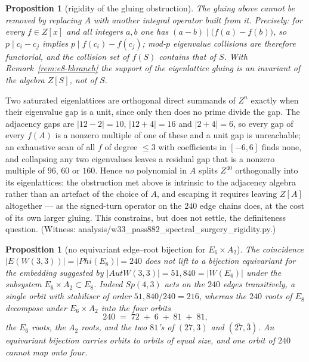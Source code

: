 \documentclass[12pt,a4paper]{article}
\def\mathbb#1{#1}%
\def\mathrm#1{#1}%
\def\texttt#1{#1}%
\def\Phi#1{Phi#1}%
\newtheorem{proposition}[theorem]{Proposition}
\theoremstyle{definition}
\newcommand{\Sp}{\mathrm{Sp}}
\newcommand{\Aut}{\mathrm{Aut}}
\newcommand{\ZZ}{\mathbb{Z}}
\begin{document}
\begin{proposition}[rigidity of the gluing obstruction]\label{prop:no-surgery}
The gluing above cannot be removed by replacing $A$ with another integral
operator built from it. Precisely: for every $f\in\ZZ[x]$ and all integers
$a,b$ one has $(a-b)\mid\bigl(f(a)-f(b)\bigr)$, so $p\mid c_i-c_j$ implies
$p\mid f(c_i)-f(c_j)$; mod-$p$ eigenvalue collisions are therefore functorial,
and the collision set of $f(S)$ contains that of $S$. With
Remark~\ref{rem:e8-kbranch} the support of the eigenlattice gluing is an
invariant of the algebra $\ZZ[S]$, not of $S$.
\end{proposition}

Two saturated eigenlattices are orthogonal direct summands of $\ZZ^n$ exactly
when their eigenvalue gap is a unit, since only then does no prime divide the
gap. The adjacency gaps are $|12-2|=10$, $|12+4|=16$ and $|2+4|=6$, so every gap
of every $f(A)$ is a nonzero multiple of one of these and a unit gap is
unreachable; an exhaustive scan of all $f$ of degree $\le 3$ with coefficients in
$[-6,6]$ finds none, and collapsing any two eigenvalues leaves a residual gap
that is a nonzero multiple of $96$, $60$ or $160$. Hence \emph{no} polynomial in
$A$ splits $\ZZ^{40}$ orthogonally into its eigenlattices: the obstruction met
above is intrinsic to the adjacency algebra rather than an artefact of the choice
of $A$, and escaping it requires leaving $\ZZ[A]$ altogether --- as the
signed-turn operator on the $240$ edge chains does, at the cost of its own larger
gluing. This constrains, but does not settle, the definiteness question.
(Witness: \texttt{analysis/w33\_pass882\_spectral\_surgery\_rigidity.py}.)

\begin{proposition}[no equivariant edge--root bijection for $E_6\times A_2$]
\label{prop:edge-root-obstruction}
The coincidence $|E(W(3,3))| = |\Phi(E_8)| = 240$ does not lift to a bijection
equivariant for the embedding suggested by $|\Aut W(3,3)| = 51{,}840 = |W(E_6)|$
under the subsystem $E_6\times A_2\subset E_8$. Indeed $\Sp(4,3)$ acts on the
$240$ edges \emph{transitively}, a single orbit with stabiliser of order
$51{,}840/240 = 216$, whereas the $240$ roots of $E_8$ decompose under
$E_6\times A_2$ into the four orbits
\[
240 \;=\; 72 \;+\; 6 \;+\; 81 \;+\; 81,
\]
the $E_6$ roots, the $A_2$ roots, and the two $81$'s of $(27,3)$ and
$(\overline{27},\overline 3)$. An equivariant bijection carries orbits to orbits
of equal size, and one orbit of $240$ cannot map onto four.
\end{proposition}
\end{document}

